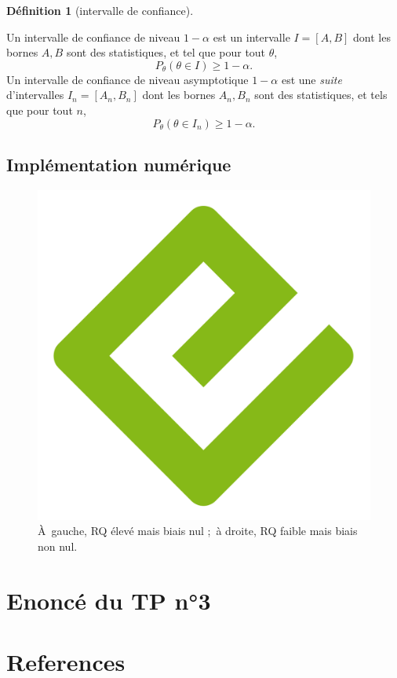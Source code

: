 \documentclass[
  10,
  letterpaper,
  DIV=11,
  numbers=noendperiod]{scrreport}
\theoremstyle{definition}
\newtheorem{definition}{Définition}[chapter]
\theoremstyle{definition}
\theoremstyle{plain}
\theoremstyle{remark}
\begin{document}
\begin{definition}[intervalle de
confiance]\protect\hypertarget{def-ic}{}\label{def-ic}

Un intervalle de confiance de niveau \(1-\alpha\) est un intervalle
\(I = [A,B]\) dont les bornes \(A,B\) sont des statistiques, et tel que
pour tout \(\theta\), \[P_\theta(\theta \in I) \geqslant 1 - \alpha.\]
Un intervalle de confiance de niveau asymptotique \(1-\alpha\) est une
\emph{suite} d'intervalles \(I_n = [A_n,B_n]\) dont les bornes
\(A_n,B_n\) sont des statistiques, et tels que pour tout \(n\),
\[ P_\theta(\theta \in I_n) \geqslant 1 - \alpha.\]

\end{definition}

\section{Implémentation numérique}\label{impluxe9mentation-numuxe9rique}

\begin{figure}[H]

{\centering \includegraphics[width=0.5\linewidth,height=\textheight,keepaspectratio]{images/cover.png}

}

\caption{À~gauche, RQ élevé mais biais nul ;~à droite, RQ faible mais
biais non nul.}

\end{figure}%

\chapter{Enoncé du TP n°3}\label{enoncuxe9-du-tp-n3}


\chapter*{References}\label{references}
\end{document}

